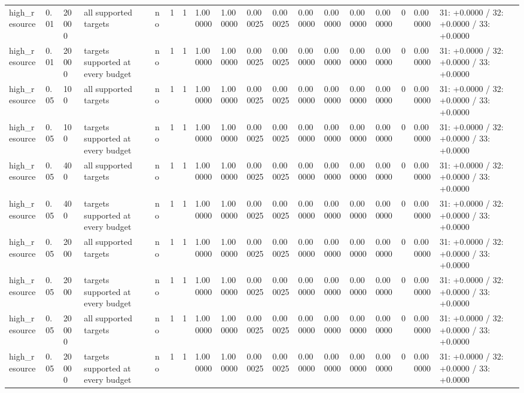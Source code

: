 \begin{tabular}{llllllllllllllllll}
high\_resource & 0.01 & 20000 & all supported targets & no & 1 & 1 & 1.000000 & 1.000000 & 0.000025 & 0.000025 & 0.000000 & 0.000000 & 0.000000 & 0.000000 & 0 & 0.000000 & 31: +0.0000 / 32: +0.0000 / 33: +0.0000 \\
high\_resource & 0.01 & 20000 & targets supported at every budget & no & 1 & 1 & 1.000000 & 1.000000 & 0.000025 & 0.000025 & 0.000000 & 0.000000 & 0.000000 & 0.000000 & 0 & 0.000000 & 31: +0.0000 / 32: +0.0000 / 33: +0.0000 \\
high\_resource & 0.05 & 100 & all supported targets & no & 1 & 1 & 1.000000 & 1.000000 & 0.000025 & 0.000025 & 0.000000 & 0.000000 & 0.000000 & 0.000000 & 0 & 0.000000 & 31: +0.0000 / 32: +0.0000 / 33: +0.0000 \\
high\_resource & 0.05 & 100 & targets supported at every budget & no & 1 & 1 & 1.000000 & 1.000000 & 0.000025 & 0.000025 & 0.000000 & 0.000000 & 0.000000 & 0.000000 & 0 & 0.000000 & 31: +0.0000 / 32: +0.0000 / 33: +0.0000 \\
high\_resource & 0.05 & 400 & all supported targets & no & 1 & 1 & 1.000000 & 1.000000 & 0.000025 & 0.000025 & 0.000000 & 0.000000 & 0.000000 & 0.000000 & 0 & 0.000000 & 31: +0.0000 / 32: +0.0000 / 33: +0.0000 \\
high\_resource & 0.05 & 400 & targets supported at every budget & no & 1 & 1 & 1.000000 & 1.000000 & 0.000025 & 0.000025 & 0.000000 & 0.000000 & 0.000000 & 0.000000 & 0 & 0.000000 & 31: +0.0000 / 32: +0.0000 / 33: +0.0000 \\
high\_resource & 0.05 & 2000 & all supported targets & no & 1 & 1 & 1.000000 & 1.000000 & 0.000025 & 0.000025 & 0.000000 & 0.000000 & 0.000000 & 0.000000 & 0 & 0.000000 & 31: +0.0000 / 32: +0.0000 / 33: +0.0000 \\
high\_resource & 0.05 & 2000 & targets supported at every budget & no & 1 & 1 & 1.000000 & 1.000000 & 0.000025 & 0.000025 & 0.000000 & 0.000000 & 0.000000 & 0.000000 & 0 & 0.000000 & 31: +0.0000 / 32: +0.0000 / 33: +0.0000 \\
high\_resource & 0.05 & 20000 & all supported targets & no & 1 & 1 & 1.000000 & 1.000000 & 0.000025 & 0.000025 & 0.000000 & 0.000000 & 0.000000 & 0.000000 & 0 & 0.000000 & 31: +0.0000 / 32: +0.0000 / 33: +0.0000 \\
high\_resource & 0.05 & 20000 & targets supported at every budget & no & 1 & 1 & 1.000000 & 1.000000 & 0.000025 & 0.000025 & 0.000000 & 0.000000 & 0.000000 & 0.000000 & 0 & 0.000000 & 31: +0.0000 / 32: +0.0000 / 33: +0.0000 \\
\bottomrule
\end{tabular}
